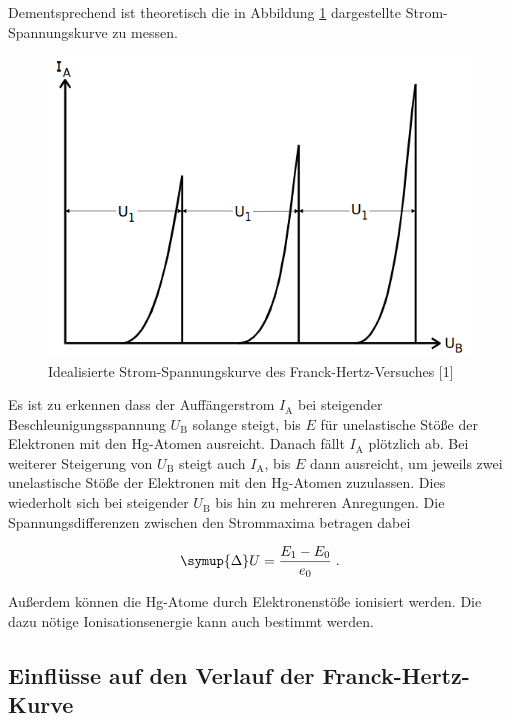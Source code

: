 Dementsprechend ist theoretisch die in Abbildung \ref{fig:bild2} dargestellte Strom-Spannungskurve zu messen.

\begin{figure} [H]
    \centering
    \includegraphics[scale=0.4]{content/bild2.png}
    \caption{Idealisierte Strom-Spannungskurve des Franck-Hertz-Versuches [1]}
    \label{fig:bild2}
  \end{figure}

  Es ist zu erkennen dass der Auffängerstrom $I_\text{A}$ bei steigender Beschleunigungsspannung $U_\text{B}$
  solange steigt, bis $E$ für unelastische Stöße der Elektronen mit den Hg-Atomen ausreicht. Danach
  fällt $I_\text{A}$ plötzlich ab. Bei weiterer Steigerung von $U_\text{B}$ steigt auch $I_\text{A}$,
  bis $E$ dann ausreicht, um jeweils zwei unelastische Stöße der Elektronen mit den Hg-Atomen zuzulassen.
  Dies wiederholt sich bei steigender $U_\text{B}$ bis hin zu mehreren Anregungen.
  Die Spannungsdifferenzen zwischen den Strommaxima betragen dabei

  \begin{equation}
      \symup{\Delta}U = \frac{E_1 - E_0}{e_0} \; .
  \end{equation}

Außerdem können die Hg-Atome durch Elektronenstöße ionisiert werden.
Die dazu nötige Ionisationsenergie kann auch bestimmt werden. 


\subsection{Einflüsse auf den Verlauf der Franck-Hertz-Kurve}

